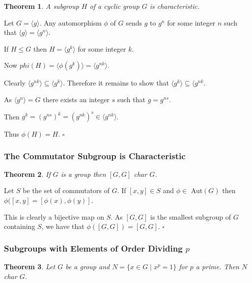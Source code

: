\documentclass[10pt]{article}
\newtheorem{theorem}{Theorem}[section]
\newenvironment{proof}[1][Proof]{\begin{trivlist}
\item[\hskip \labelsep {\itshape #1}]}{\end{trivlist}}
\begin{document}
\begin{theorem}
A subgroup $H$ of a cyclic group $G$ is characteristic.
\end{theorem}

\begin{proof}
Let $G = \langle g \rangle$. Any automorphism $\phi$ of $G$ sends $g$ to $g^n$ for some integer $n$ such that $\langle g \rangle = \langle g^n \rangle$.

If $H \leq G$ then $H = \langle g^k \rangle$ for some integer $k$.

Now $phi(H) = \langle \phi(g^k) \rangle = \langle g^{nk} \rangle$.

Clearly $\langle g^{nk} \rangle \subseteq \langle g^k \rangle$. Therefore it remains to show that $\langle g^k \rangle \subseteq \langle g^{nk}$.

As $\langle g^n \rangle = G$ there exists an integer $s$ such that $g = g^{ns}$.

Then $g^k = (g^{ns})^k = (g^{nk})^s \in \langle g^{nk} \rangle$.

Thus $\phi(H) = H$. $\square$
\end{proof}

\subsubsection{The Commutator Subgroup is Characteristic}

\begin{theorem}
If $G$ is a group then $[G, G]$ char $G$.
\end{theorem}

\begin{proof}
Let $S$ be the set of commutators of $G$. If $[x, y] \in S$ and $\phi \in$ Aut$(G)$ then $\phi([x, y] = [\phi(x), \phi(y)]$.

This is clearly a bijective map on $S$. As $[G, G]$ is the smallest subgroup of $G$ containing $S$, we have that $\phi([G, G]) = [G, G]$. $\square$
\end{proof}

\subsubsection{Subgroups with Elements of Order Dividing $p$}

\begin{theorem}
Let $G$ be a group and $N = \{x \in G \;|\; x^p = 1\}$ for $p$ a prime. Then $N$ char $G$.
\end{theorem}
\end{document}
